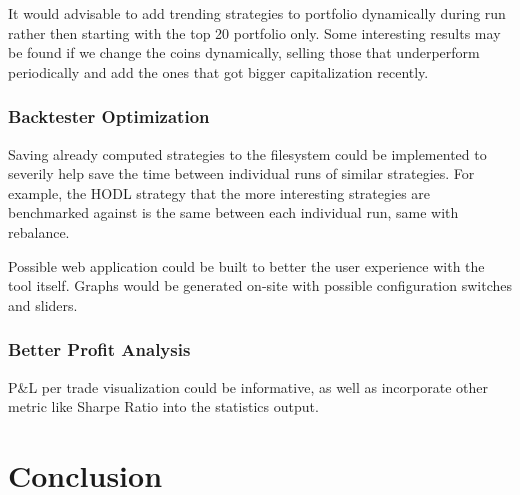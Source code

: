 It would advisable to add trending strategies to portfolio dynamically during run rather then starting with the top 20 portfolio only. Some interesting results may be found if we change the coins dynamically, selling those that underperform periodically and add the ones that got bigger capitalization recently.

\subsection*{Backtester Optimization}
Saving already computed strategies to the filesystem could be implemented to severily help save the time between individual runs of similar strategies. For example, the HODL strategy that the more interesting strategies are benchmarked against is the same between each individual run, same with rebalance.

Possible web application could be built to better the user experience with the tool itself. Graphs would be generated on-site with possible configuration switches and sliders.

\subsection*{Better Profit Analysis}
P\&L per trade visualization could be informative, as well as incorporate other metric like Sharpe Ratio into the statistics output.

\chapter{Conclusion}
\label{conclusion}
